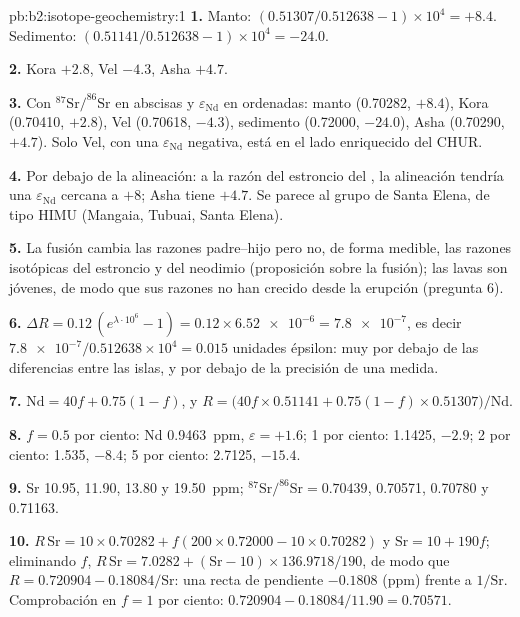 \begin{solution}{pb:b2:isotope-geochemistry:1}
\textbf{1.} Manto: $(0.51307/0.512638 - 1)\times10^4 = +8.4$. Sedimento:
$(0.51141/0.512638 - 1)\times10^4 = -24.0$.

\textbf{2.} Kora $+2.8$, Vel $-4.3$, Asha $+4.7$.

\textbf{3.} Con $^{87}\mathrm{Sr}/^{86}\mathrm{Sr}$ en abscisas y $\varepsilon_{\mathrm{Nd}}$ en ordenadas:
manto (0.70282, $+8.4$), Kora (0.70410, $+2.8$), Vel (0.70618, $-4.3$), sedimento
(0.72000, $-24.0$), Asha (0.70290, $+4.7$). Solo Vel, con una
$\varepsilon_{\mathrm{Nd}}$ negativa, está en el lado enriquecido del CHUR.

\textbf{4.} Por debajo de la alineación: a la razón del estroncio del , la alineación
tendría una $\varepsilon_{\mathrm{Nd}}$ cercana a $+8$; Asha tiene $+4.7$. Se parece al
grupo de Santa Elena, de tipo HIMU (Mangaia, Tubuai, Santa Elena).

\textbf{5.} La fusión cambia las razones padre--hijo pero no, de forma medible, las
razones isotópicas del estroncio y del neodimio (proposición sobre la fusión); las lavas son
jóvenes, de modo que sus razones no han crecido desde la erupción (pregunta 6).

\textbf{6.} $\Delta R = 0.12\,(e^{\lambda\cdot10^6} - 1) = 0.12\times\num{6.52e-6} =
\num{7.8e-7}$, es decir $\num{7.8e-7}/0.512638\times10^4 = 0.015$ unidades épsilon: muy por debajo de las
diferencias entre las islas, y por debajo de la precisión de una medida.

\textbf{7.} $\mathrm{Nd} = 40f + 0.75(1-f)$, y
$R = \bigl(40f\times0.51141 + 0.75(1-f)\times0.51307\bigr)/\mathrm{Nd}$.

\textbf{8.} $f = 0.5$ por ciento: Nd \qty{0.9463}{ppm}, $\varepsilon = +1.6$; 1 por ciento:
1.1425, $-2.9$; 2 por ciento: 1.535, $-8.4$; 5 por ciento: 2.7125, $-15.4$.

\textbf{9.} Sr 10.95, 11.90, 13.80 y \qty{19.50}{ppm}; $^{87}\mathrm{Sr}/^{86}\mathrm{Sr} =
0.70439$, 0.70571, 0.70780 y 0.71163.

\textbf{10.} $R\,\mathrm{Sr} = 10\times0.70282 + f(200\times0.72000 - 10\times0.70282)$ y
$\mathrm{Sr} = 10 + 190f$; eliminando $f$, $R\,\mathrm{Sr} = 7.0282 +
(\mathrm{Sr}-10)\times136.9718/190$, de modo que $R = 0.720904 - 0.18084/\mathrm{Sr}$: una recta
de pendiente $-0.1808$ (ppm) frente a $1/\mathrm{Sr}$. Comprobación en $f = 1$ por ciento:
$0.720904 - 0.18084/11.90 = 0.70571$.


\end{solution}
